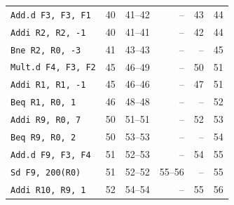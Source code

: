 \begin{tabular}{@{}lrrrrr@{}}
\texttt{Add.d F3, F3, F1} & 40 & 41--42 & -- & 43 & 44 \\
\texttt{Addi R2, R2, -1} & 40 & 41--41 & -- & 42 & 44 \\
\texttt{Bne R2, R0, -3} & 41 & 43--43 & -- & -- & 45 \\
\texttt{Mult.d F4, F3, F2} & 45 & 46--49 & -- & 50 & 51 \\
\texttt{Addi R1, R1, -1} & 45 & 46--46 & -- & 47 & 51 \\
\texttt{Beq R1, R0, 1} & 46 & 48--48 & -- & -- & 52 \\
\texttt{Addi R9, R0, 7} & 50 & 51--51 & -- & 52 & 53 \\
\texttt{Beq R9, R0, 2} & 50 & 53--53 & -- & -- & 54 \\
\texttt{Add.d F9, F3, F4} & 51 & 52--53 & -- & 54 & 55 \\
\texttt{Sd F9, 200(R0)} & 51 & 52--52 & 55--56 & -- & 55 \\
\texttt{Addi R10, R9, 1} & 52 & 54--54 & -- & 55 & 56 \\
\bottomrule\end{tabular}